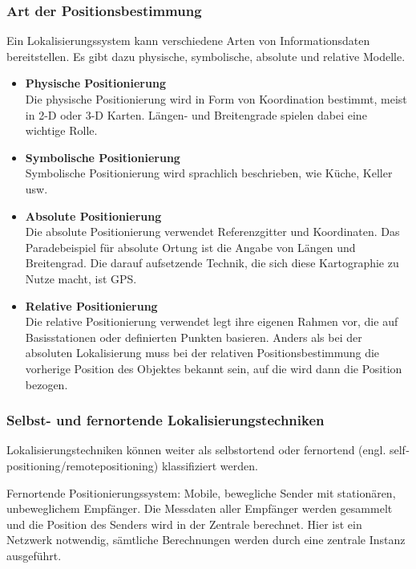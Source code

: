     \subsubsection{Art der Positionsbestimmung}

    Ein Lokalisierungssystem kann verschiedene Arten von Informationsdaten bereitstellen. Es gibt dazu physische, symbolische, absolute und relative Modelle.

      \begin{itemize}
        \item \textbf{Physische Positionierung}\\
        Die physische Positionierung wird in Form von Koordination bestimmt, meist in 2-D oder 3-D Karten. Längen- und Breitengrade spielen dabei eine wichtige Rolle.
        \item \textbf{Symbolische Positionierung}\\
        Symbolische Positionierung wird sprachlich beschrieben, wie \zB Küche, Keller usw.
        \item \textbf{Absolute Positionierung}\\
        Die absolute Positionierung verwendet Referenzgitter und Koordinaten. Das Paradebeispiel für absolute Ortung ist die Angabe von Längen­ und Breitengrad.
        Die darauf aufsetzende Technik, die sich diese Kartographie zu Nutze macht, ist GPS.
        \item \textbf{Relative Positionierung}\\
        Die relative Positionierung verwendet legt ihre eigenen Rahmen vor, die auf Basisstationen oder definierten Punkten basieren.
        Anders als bei der absoluten Lokalisierung muss bei der relativen Positionsbestimmung die vorherige Position des Objektes bekannt sein, auf die wird dann die Position bezogen.
      \end{itemize}


    \subsubsection{Selbst- und fernortende Lokalisierungstechniken}

    Lokalisierungstechniken können weiter als selbstortend oder fernortend (engl. self­positioning/remote­positioning) klassifiziert werden.

    Fernortende Positionierungssystem: Mobile, bewegliche Sender mit stationären, unbeweglichem Empfänger. Die Messdaten aller Empfänger werden gesammelt und die
    Position des Senders wird in der Zentrale berechnet. Hier ist ein Netzwerk notwendig, sämtliche Berechnungen werden durch eine zentrale Instanz ausgeführt.

